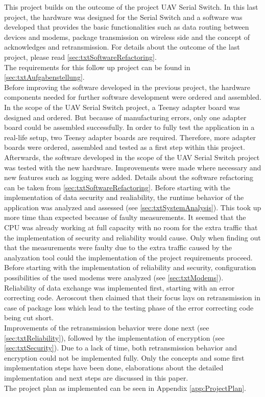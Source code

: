 %
This project builds on the outcome of the project UAV Serial Switch. In this last project, the hardware was designed for the Serial Switch and a software was developed that provides the basic functionalities such as data routing between devices and modems, package transmission on wireless side and the concept of acknowledges and retransmission. For details about the outcome of the last project, please read \autoref{sec:txtSoftwareRefactoring}.\\
The requirements for this follow up project can be found in \autoref{sec:txtAufgabenstellung}.\\
Before improving the software developed in the previous project, the hardware components needed for further software development were ordered and assembled. In the scope of the UAV Serial Switch project, a Teensy adapter board was designed and ordered. But because of manufacturing errors, only one adapter board could be assembled successfully. In order to fully test the application in a real-life setup, two Teensy adapter boards are required. Therefore, more adapter boards were ordered, assembled and tested as a first step within this project.\\
Afterwards, the software developed in the scope of the UAV Serial Switch project was tested with the new hardware. Improvements were made where necessary and new features such as logging were added. Details about the software refactoring can be taken from \autoref{sec:txtSoftwareRefactoring}. Before starting with the implementation of data security and realiability, the runtime behavior of the application was analyzed and assessed (see \autoref{sec:txtSystemAnalysis}). This took up more time than expected because of faulty measurements. It seemed that the CPU was already working at full capacity with no room for the extra traffic that the implementation of security and reliability would cause. Only when finding out that the measurements were faulty due to the extra traffic caused by the analyzation tool could the implementation of the project requirements proceed.\\
Before starting with the implementation of reliability and security, configuration possibilities of the used modems were analyzed (see \autoref{sec:txtModems}).\\ 
Reliability of data exchange was implemented first, starting with an error correcting code. Aeroscout then claimed that their focus lays on retransmission in case of package loss which lead to the testing phase of the error correcting code being cut short.\\
Improvements of the retransmission behavior were done next (see \autoref{sec:txtReliability}), followed by the implementation of encryption (see \autoref{sec:txtSecurity}). Due to a lack of time, both retransmission behavior and encryption could not be implemented fully. Only the concepts and some first implementation steps have been done, elaborations about the detailed implementation and next steps are discussed in this paper.\\
The project plan as implemented can be seen in Appendix \autoref{app:ProjectPlan}.